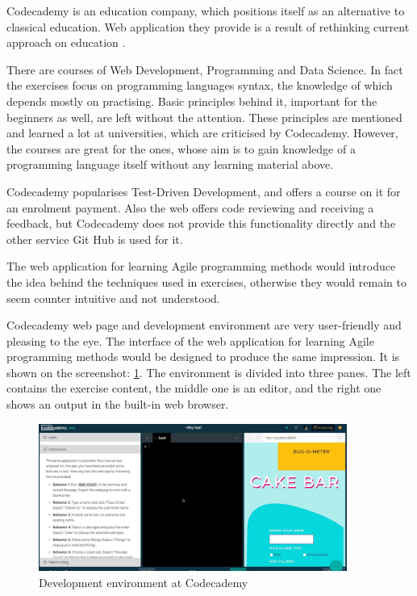 Codecademy is an education company, which positions itself as an alternative to classical education. Web application they provide is a result of rethinking current approach on education \cite[About]{codecademy}.

There are courses of Web Development, Programming and Data Science. In fact the exercises focus on programming languages syntax, the knowledge of which depends mostly on practising. Basic principles behind it, important for the beginners as well, are left without the attention. These principles are mentioned and learned a lot at universities, which are criticised by Codecademy. However, the courses are great for the ones, whose aim is to gain knowledge of a programming language itself without any learning material above.

Codecademy popularises Test-Driven Development, and offers a course on it for an enrolment payment. Also the web offers code reviewing and receiving a feedback, but Codecademy does not provide this functionality directly and the other service Git Hub is used for it.

The web application for learning Agile programming methods would introduce the idea behind the techniques used in exercises, otherwise they would remain to seem counter intuitive and not understood.

Codecademy web page and development environment are very user-friendly and pleasing to the eye. The interface of the web application for learning Agile programming methods would be designed to produce the same impression. It is shown on the screenshot: \ref{fig:codecademy}. The environment is divided into three panes. The left contains the exercise content, the middle one is an editor, and the right one shows an output in the built-in web browser.

\begin{figure}[h]
    \centerline{\includegraphics[width=0.9\textwidth]{images/codecademy}}
    \caption{Development environment at Codecademy}
    \label{fig:codecademy}
\end{figure}


